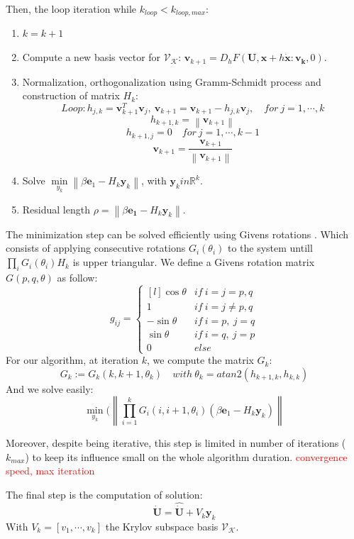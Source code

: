 \documentclass[a4paper, 12pt]{report}
\newcommand\norm[1]{\left\lVert#1\right\rVert}
\begin{document}
Then, the loop iteration while $k_{loop} < k_{loop,max}$:
\begin{enumerate}
\item $k = k+1$
\item Compute a new basis vector for $\mathcal{V}_\mathcal{K}$: $\boldsymbol{v}_{k+1} =  D_h F(\boldsymbol{U}, \boldsymbol{x}+ h\boldsymbol{\dot x} : \boldsymbol{v_k}, 0)$.
\item Normalization, orthogonalization using Gramm-Schmidt process and construction of matrix $H_k$:
\[ Loop: h_{j,k} = \boldsymbol{v}_{k+1}^T \boldsymbol{v}_j,\ \boldsymbol{v}_{k+1} = \boldsymbol{v}_{k+1} - h_{j,k}\boldsymbol{v}_j, \quad for\ j = 1, \cdots, k \]
\[ h_{k+1,k} = \norm{\boldsymbol{v}_{k+1}} \]
\[ h_{k+1, j} =  0\quad for\ j = 1, \cdots, k-1 \]
\[ \boldsymbol{v}_{k+1} = \frac{\boldsymbol{v}_{k+1}}{\norm{\boldsymbol{v}_{k+1}}} \]
\item Solve $\min\limits_{y_k}\norm{\beta \boldsymbol{e}_1 - H_k\boldsymbol{y}_k}$, with $\boldsymbol{y}_k in \mathbb{R}^k$.
\item Residual length $\rho = \norm{\beta \boldsymbol{e_1} - H_k\boldsymbol{y}_k}$.
\end{enumerate}

The minimization step can be solved efficiently using Givens rotations \cite{Bjorck1996}. Which consists of applying consecutive rotations $G_i(\theta_i)$ to the system untill $\prod_i G_i(\theta_i) H_k$ is upper triangular.
We define a Givens rotation matrix $G(p, q, \theta)$ as follow:
\[ g_{ij} = \left\{ \begin{matrix*}[l] \cos{\theta} &  if\ i = j = p, q \\ 1 & if\ i = j \neq p, q  \\  -\sin{\theta} &  if\ i = p,\ j = q \\ \sin{\theta} &  if\ i = q,\ j = p \\ 0 & else \end{matrix*} \right.\]
For our algorithm, at iteration $k$, we compute the matrix $G_k$:
\[ G_k := G_k(k, k+1, \theta_k) \quad with\ \theta_k = atan2(h_{k+1, k}, h_{k,k})\]
And we solve easily:
\[ \min\limits_{y_k}(\norm{\prod\limits_{i=1}^k G_i(i, i+1, \theta_i) (\beta \boldsymbol{e}_1 - H_k \boldsymbol{y}_k)} \]

Moreover, despite being iterative, this step is limited in number of iterations ($k_{max}$) to keep its influence small on the whole algorithm duration. \textcolor{red}{convergence speed, max iteration}

The final step is the computation of solution:
\[ \boldsymbol{\dot U} = \boldsymbol{\hat{ \dot U}} + V_k \boldsymbol{y}_k \]
With $V_k = [v_1, \cdots, v_k]$ the Krylov subspace basis $\mathcal{V}_\mathcal{K}$.
\end{document}
